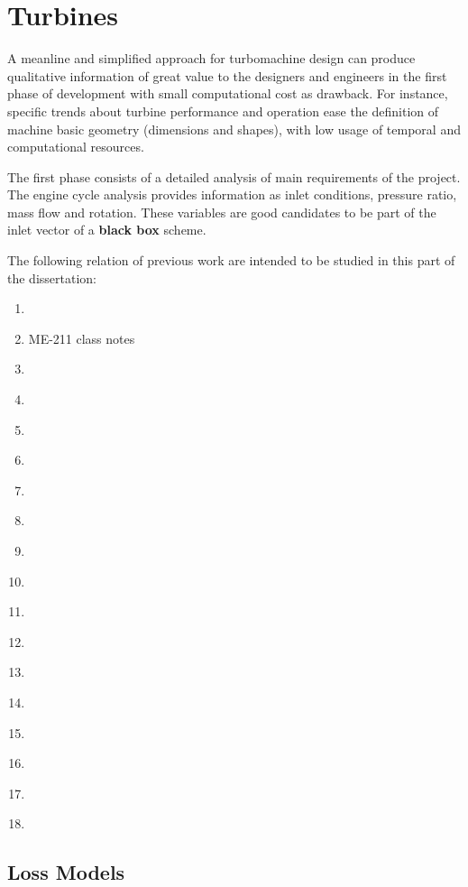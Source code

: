 \section{Turbines}
A meanline and simplified approach for turbomachine design can produce qualitative information of great value to the designers and engineers in the first phase of development with small computational cost as drawback. For instance, specific trends about turbine performance and operation ease the definition of machine basic geometry (dimensions and shapes), with low usage of temporal and computational resources.

The first phase consists of a detailed analysis of main requirements of the project. The engine cycle analysis provides information as inlet conditions, pressure ratio, mass flow and rotation. These variables are good candidates to be part of the inlet vector of a \textbf{black box} scheme.

The following relation of previous work are intended to be studied in this part of the dissertation:
\begin{enumerate}
    \item \cite{Saravanamuttoo2017}
    \item ME-211 class notes
    \item \cite{Ovsyannikov1971}
    \item \cite{Belyaev1999}
    \item \cite{IgorGeorge2020}
    \item \cite{Schobeiri2018}
    \item \cite{Denton1993}
    \item \cite{Maia2019}
    \item \cite{Denton1998}
    \item \cite{Craig1970}
    \item \cite{Leach1983}
    \item \cite{Kadhim2018}
    \item \cite{DentonWallis1998}
    \item \cite{Lee2018}
    \item \cite{Noh2004}
    \item \cite{Ohlsson1962}
    \item \cite{Cho2008}
    \item \cite{Varma2012}
\end{enumerate}

\subsection{Loss Models}

